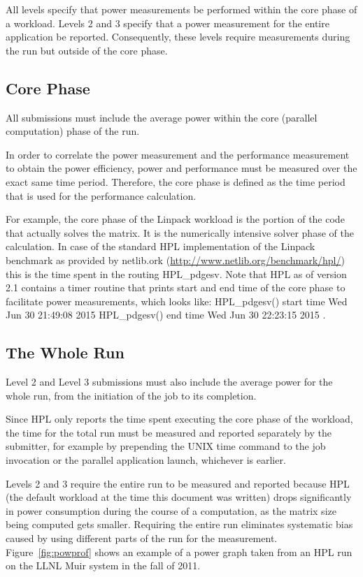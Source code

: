 \noindent
All levels specify that power measurements be performed within the core phase of a workload. Levels 2 and 3 specify that a power measurement for the entire application be reported. Consequently, these levels require measurements during the run but outside of the core phase.

\subsection{Core Phase}
\label{sec:core_phase}
\noindent
All submissions must include the average power within the core (parallel computation) phase of the run. 
\wl

\noindent
In order to correlate the power measurement and the performance measurement to obtain the power efficiency, power and performance must be measured over the exact same time period.
Therefore, the core phase is defined as the time period that is used for the performance calculation.
\wl

\noindent
For example, the core phase of the Linpack workload is the portion of the code that actually solves the matrix.
It is the numerically intensive solver phase of the calculation.
In case of the standard HPL implementation of the Linpack benchmark as provided by netlib.ork (\url{http://www.netlib.org/benchmark/hpl/}) this is the time spent in the routing {\ttfamily HPL\_pdgesv}.
Note that HPL as of version 2.1 contains a timer routine that prints start and end time of the core phase to facilitate power measurements, which looks like:\newline
{\ttfamily
HPL\_pdgesv() start time Wed Jun 30 21:49:08 2015\newline
HPL\_pdgesv() end time Wed Jun 30 22:23:15 2015
}.

\subsection{The Whole Run}
\noindent
Level 2 and Level 3 submissions must also include the average power for the whole run, from the initiation of the job to its completion. 
\wl

\noindent
Since HPL only reports the time spent executing the core phase of the workload, the time for the total run must be measured and reported separately by the submitter, for example by prepending the UNIX time command to the job invocation or the parallel application launch, whichever is earlier.
\wl

\noindent
Levels 2 and 3 require the entire run to be measured and reported because HPL (the default workload at the time this document was written) drops significantly in power consumption during the course of a computation, as the matrix size being computed gets smaller.  Requiring the entire run eliminates systematic bias caused by using different parts of the run for the measurement. Figure~\ref{fig:powprof} shows an example of a power graph taken from an HPL run on the LLNL Muir system in the fall of 2011.
\wl

